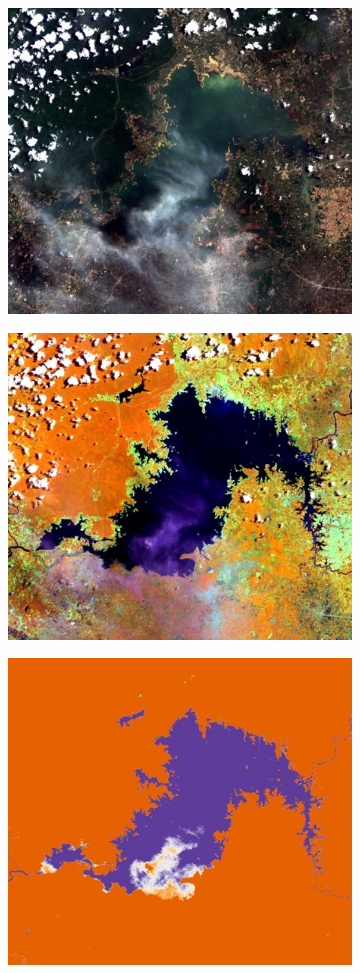 \begin{figure}
	\begin{subfigure}{0.24\textwidth}
		\centering
		\includegraphics[width=.8\linewidth]{figures/trueColor.jpg}
		\caption{}
	\end{subfigure}
	\begin{subfigure}{0.24\textwidth}
		\centering
		\includegraphics[width=.8\linewidth]{figures/landwater.jpg}
		\caption{}
	\end{subfigure}
	\begin{subfigure}{0.24\textwidth}
		\centering
		\includegraphics[width=.8\linewidth]{figures/ndwi.jpg}

\end{subfigure}
\end{figure}
